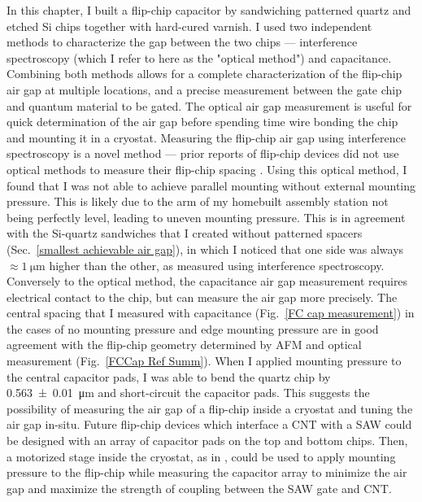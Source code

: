 \documentclass[double,12pt,1in,seploa]{beavtex}
\begin{document}
In this chapter, I built a flip-chip capacitor by sandwiching patterned quartz and etched Si chips together with hard-cured varnish. I used two independent methods to characterize the gap between the two chips — interference spectroscopy (which I refer to here as the "optical method") and capacitance. Combining both methods allows for a complete characterization of the flip-chip air gap at multiple locations, and a precise measurement between the gate chip and quantum material to be gated. The optical air gap measurement is useful for quick determination of the air gap before spending time wire bonding the chip and mounting it in a cryostat. Measuring the flip-chip air gap using interference spectroscopy is a novel method — prior reports of flip-chip devices did not use optical methods to measure their flip-chip spacing \cite{beukman_noninvasive_2015, chu_creation_2018,satzinger_quantum_2018,bennaceur_mechanical_2015}. Using this optical method, I found that I was not able to achieve parallel mounting without external mounting pressure. This is likely due to the arm of my homebuilt assembly station not being perfectly level, leading to uneven mounting pressure. This is in agreement with the Si-quartz sandwiches that I created without patterned spacers (Sec.\ \ref{smallest achievable air gap}), in which I noticed that one side was always $\approx \SI{1}{\micro\meter}$ higher than the other, as measured using interference spectroscopy. Conversely to the optical method, the capacitance air gap measurement requires electrical contact to the chip, but can measure the air gap more precisely. The central spacing that I measured with capacitance (Fig.\ \ref{FC cap measurement}) in the cases of no mounting pressure and edge mounting pressure are in good agreement with the flip-chip geometry determined by AFM and optical measurement (Fig.\ \ref{FCCap Ref Summ}). When I applied mounting pressure to the central capacitor pads, I was able to bend the quartz chip by \SI{0.563(10)}{\micro\meter} and short-circuit the capacitor pads. This suggests the possibility of measuring the air gap of a flip-chip inside a cryostat and tuning the air gap in-situ. Future flip-chip devices which interface a CNT with a SAW could be designed with an array of capacitor pads on the top and bottom chips. Then, a motorized stage inside the cryostat, as in \cite{inbar_quantum_2023}, could be used to apply mounting pressure to the flip-chip while measuring the capacitor array to minimize the air gap and maximize the strength of coupling between the SAW gate and CNT. 
\end{document}
